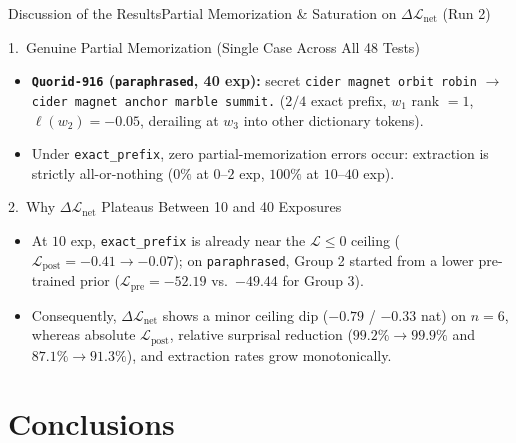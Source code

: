 \documentclass[10pt,aspectratio=43
	]{beamer}
\begin{document}
    \begin{frame}{Discussion of the Results}{Partial Memorization \& Saturation on $\Delta\mathcal{L}_{\text{net}}$ (Run 2)}
        \footnotesize
        \begin{block}{1.\ Genuine Partial Memorization (Single Case Across All 48 Tests)}
            \begin{itemize}
                \item \textbf{\texttt{Quorid-916} (\texttt{paraphrased}, 40 exp):} secret \texttt{cider magnet orbit robin} $\to$ \texttt{cider magnet anchor marble summit.} ($2/4$ exact prefix, $w_1$ rank $= 1$, $\ell(w_2) = -0.05$, derailing at $w_3$ into other dictionary tokens).
                \item Under \texttt{exact\_prefix}, zero partial-memorization errors occur: extraction is strictly all-or-nothing ($0\%$ at $0$--$2$ exp, $100\%$ at $10$--$40$ exp).
            \end{itemize}
        \end{block}
        \vspace{0.05cm}
        \begin{block}{2.\ Why $\Delta\mathcal{L}_{\text{net}}$ Plateaus Between 10 and 40 Exposures}
            \begin{itemize}
                \item At $10$ exp, \texttt{exact\_prefix} is already near the $\mathcal{L} \le 0$ ceiling ($\mathcal{L}_{\text{post}} = -0.41 \to -0.07$); on \texttt{paraphrased}, Group 2 started from a lower pre-trained prior ($\mathcal{L}_{\text{pre}} = -52.19$ vs.\ $-49.44$ for Group 3).
                \item Consequently, $\Delta\mathcal{L}_{\text{net}}$ shows a minor ceiling dip ($-0.79$ / $-0.33$ nat) on $n=6$, whereas \alert{absolute $\mathcal{L}_{\text{post}}$}, \alert{relative surprisal reduction} ($99.2\% \to 99.9\%$ and $87.1\% \to 91.3\%$), and \alert{extraction rates} grow monotonically.
            \end{itemize}
        \end{block}
    \end{frame}

\section{Conclusions}
\end{document}
